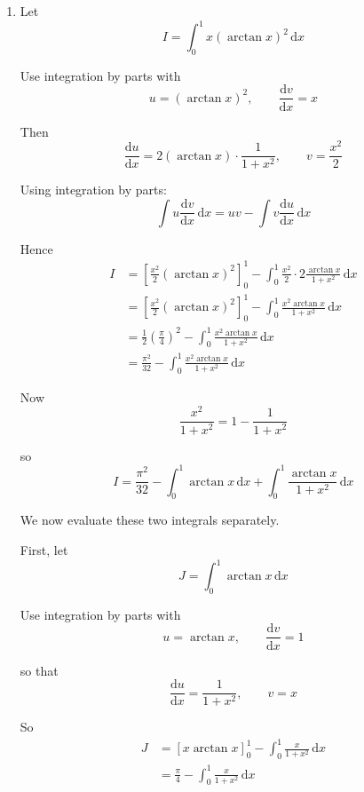\documentclass[leqno]{article}
\begin{document}
\begin{enumerate}[
  label=\textbf{\arabic*.},
  leftmargin=*,
  topsep=0pt,
  partopsep=0pt,
  parsep=0pt
]
\begin{djsSolution}
\begin{enumerate}[label=\textbf{(\roman*)}]
Differentiate implicitly with respect to \(x\):
\[
1=\sec^2 y\,\frac{\mathrm{d}y}{\mathrm{d}x}
\]

So
\begin{align*}
\frac{\mathrm{d}y}{\mathrm{d}x}
&=\frac{1}{\sec^2 y}\\
&=\frac{1}{1+\tan^2 y}\\
&=\frac{1}{1+x^2}
\end{align*}

since \(\tan y=x\).

Therefore
\[
\frac{\mathrm{d}}{\mathrm{d}x}(\arctan x)=\frac{1}{1+x^2}
\]

  \item Let
\[
I=\int_0^1 x(\arctan x)^2\,\mathrm{d}x
\]

Use integration by parts with
\[
u=(\arctan x)^2,
\qquad
\frac{\mathrm{d}v}{\mathrm{d}x}=x
\]

Then
\[
\frac{\mathrm{d}u}{\mathrm{d}x}=2(\arctan x)\cdot \frac{1}{1+x^2},
\qquad
v=\frac{x^2}{2}
\]

Using integration by parts:
\[
\int u\frac{\mathrm{d}v}{\mathrm{d}x}\,\mathrm{d}x = uv - \int v\frac{\mathrm{d}u}{\mathrm{d}x}\,\mathrm{d}x
\]

Hence
\begin{align*}
I
&=\left[\frac{x^2}{2}(\arctan x)^2\right]_0^1-\int_0^1 \frac{x^2}{2}\cdot 2\frac{\arctan x}{1+x^2}\,\mathrm{d}x\\
&=\left[\frac{x^2}{2}(\arctan x)^2\right]_0^1-\int_0^1 \frac{x^2\arctan x}{1+x^2}\,\mathrm{d}x\\
&=\frac{1}{2}\left(\frac{\pi}{4}\right)^2-\int_0^1 \frac{x^2\arctan x}{1+x^2}\,\mathrm{d}x\\
&=\frac{\pi^2}{32}-\int_0^1 \frac{x^2\arctan x}{1+x^2}\,\mathrm{d}x
\end{align*}

Now
\[
\frac{x^2}{1+x^2}=1-\frac{1}{1+x^2}
\]

so
\[
I=\frac{\pi^2}{32}-\int_0^1 \arctan x\,\mathrm{d}x+\int_0^1 \frac{\arctan x}{1+x^2}\,\mathrm{d}x
\]

We now evaluate these two integrals separately.

First, let
\[
J=\int_0^1 \arctan x\,\mathrm{d}x
\]

Use integration by parts with
\[
u=\arctan x,
\qquad
\frac{\mathrm{d}v}{\mathrm{d}x}=1
\]

so that
\[
\frac{\mathrm{d}u}{\mathrm{d}x}=\frac{1}{1+x^2},
\qquad
v=x
\]

So
\begin{align*}
J
&=\left[x\arctan x\right]_0^1-\int_0^1 \frac{x}{1+x^2}\,\mathrm{d}x\\
&=\frac{\pi}{4}-\int_0^1 \frac{x}{1+x^2}\,\mathrm{d}x
\end{align*}


\end{enumerate}
\end{djsSolution}
\end{enumerate}
\end{document}

